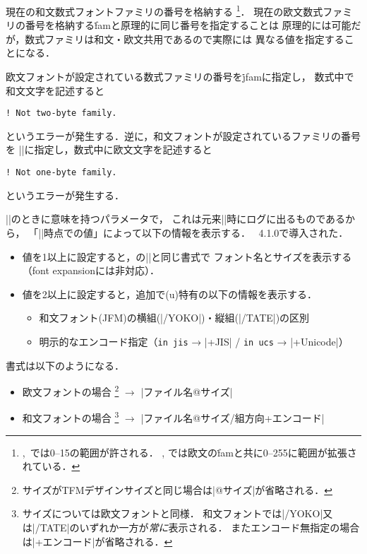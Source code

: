 \documentclass[a4paper,11pt,nomag,dvipdfmx]{jsarticle}
\begin{document}
\begin{cslist}
\csitem[\.{jfam}=<number>]
  現在の和文数式フォントファミリの番号を格納する
  \footnote{\pTeX,~\upTeX では0--15の範囲が許される．
  \epTeX, \eupTeX では欧文の\.{fam}と共に0--255に範囲が拡張されている．}．
  現在の欧文数式ファミリの番号を格納する\.{fam}と原理的に同じ番号を指定することは
  原理的には可能だが，数式ファミリは和文・欧文共用であるので実際には
  異なる値を指定することになる．

  欧文フォントが設定されている数式ファミリの番号を\.{jfam}に指定し，
  数式中で和文文字を記述すると
\begin{verbatim}
! Not two-byte family.
\end{verbatim}
  というエラーが発生する．逆に，和文フォントが設定されているファミリの番号を
  |\fam|に指定し，数式中に欧文文字を記述すると
\begin{verbatim}
! Not one-byte family.
\end{verbatim}
  というエラーが発生する．

  ||のときに意味を持つパラメータで，
  これは元来|\shipout|時にログに出るものであるから，
  「|\shipout|時点での値」によって以下の情報を表示する．
  \pTeX~4.1.0で導入された．
 \begin{itemize}
  \item 値を1以上に設定すると，\pdfTeX の|\pdftracingfonts|と同じ書式で
   フォント名とサイズを表示する（font expansionには非対応）．
  \item 値を2以上に設定すると，追加で(u)\pTeX 特有の以下の情報を表示する．
   \begin{itemize}
    \item 和文フォント(JFM)の横組(|/YOKO|)・縦組(|/TATE|)の区別
    \item 明示的なエンコード指定（\verb|in jis| → |+JIS| / \verb|in ucs| → |+Unicode|）
   \end{itemize}
 \end{itemize}
  書式は以下のようになる．
 \begin{itemize}
  \item 欧文フォントの場合
    \footnote{サイズがTFMデザインサイズと同じ場合は|@サイズ|が省略される．}
    $\rightarrow$ |ファイル名@サイズ|
  \item 和文フォントの場合
    \footnote{サイズについては欧文フォントと同様．
      和文フォントでは|/YOKO|又は|/TATE|のいずれか一方が\emph{常に}表示される．
      またエンコード無指定の場合は|+エンコード|が省略される．}
    $\rightarrow$ |ファイル名@サイズ/組方向+エンコード|
 \end{itemize}


\end{cslist}
\end{document}
